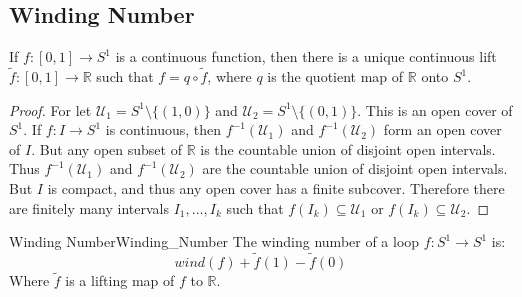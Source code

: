     \subsection{Winding Number}
        \begin{theorem}
            If $f:[0,1]\rightarrow{S}^{1}$ is a continuous
            function, then there is a unique continuous lift
            $\tilde{f}:[0,1]\rightarrow\mathbb{R}$ such that
            $f=q\circ\tilde{f}$, where $q$ is the quotient map
            of $\mathbb{R}$ onto $S^{1}$.
        \end{theorem}
        \begin{proof}
            For let $\mathcal{U}_{1}=S^{1}\setminus\{(1,0)\}$ and
            $\mathcal{U}_{2}=S^{1}\setminus\{(0,1)\}$. This is an
            open cover of $S^{1}$. If $f:I\rightarrow{S}^{1}$ is
            continuous, then $f^{-1}(\mathcal{U}_{1})$ and
            $f^{-1}(\mathcal{U}_{2})$ form an open cover of
            $I$. But any open subset of $\mathbb{R}$ is the
            countable union of disjoint open intervals. Thus
            $f^{-1}(\mathcal{U}_{1})$ and
            $f^{-1}(\mathcal{U}_{2})$ are the countable union of
            disjoint open intervals. But $I$ is compact, and
            thus any open cover has a finite subcover. Therefore
            there are finitely many intervals $I_{1},\dots,I_{k}$
            such that $f(I_{k})\subseteq\mathcal{U}_{1}$ or
            $f(I_{k})\subseteq\mathcal{U}_{2}$.
        \end{proof}
        \begin{ldefinition}{Winding Number}{Winding_Number}
            The winding number of a loop
            $f:S^{1}\rightarrow{S}^{1}$ is:
            \begin{equation}
                wind(f)+\tilde{f}(1)-\tilde{f}(0)
            \end{equation}
            Where $\tilde{f}$ is a lifting map of $f$ to
            $\mathbb{R}$.
        \end{ldefinition}
